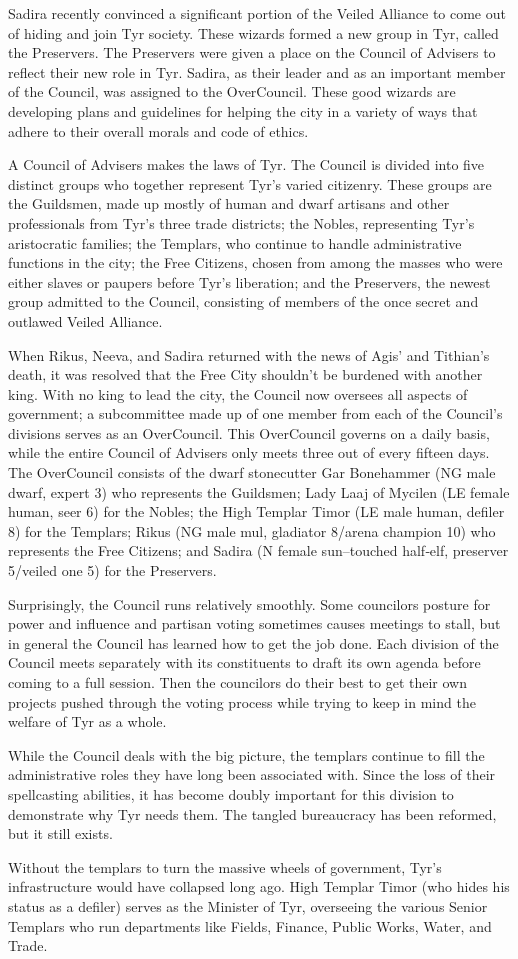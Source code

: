 {	Sadira recently convinced a significant portion of the Veiled Alliance to come out of hiding and join Tyr society. These wizards formed a new group in Tyr, called the Preservers. The Preservers were given a place on the Council of Advisers to reflect their new role in Tyr. Sadira, as their leader and as an important member of the Council, was assigned to the OverCouncil. These good wizards are developing plans and guidelines for helping the city in a variety of ways that adhere to their overall morals and code of ethics.
}
{
	A Council of Advisers makes the laws of Tyr. The Council is divided into five distinct groups who together represent Tyr's varied citizenry. These groups are the Guildsmen, made up mostly of human and dwarf artisans and other professionals from Tyr's three trade districts; the Nobles, representing Tyr's aristocratic families; the Templars, who continue to handle administrative functions in the city; the Free Citizens, chosen from among the masses who were either slaves or paupers before Tyr's liberation; and the Preservers, the newest group admitted to the Council, consisting of members of the once secret and outlawed Veiled Alliance.

	When Rikus, Neeva, and Sadira returned with the news of Agis' and Tithian's death, it was resolved that the Free City shouldn't be burdened with another king. With no king to lead the city, the Council now oversees all aspects of government; a subcommittee made up of one member from each of the Council's divisions serves as an OverCouncil. This OverCouncil governs on a daily basis, while the entire Council of Advisers only meets three out of every fifteen days. The OverCouncil consists of the dwarf stonecutter Gar Bonehammer (NG male dwarf, expert 3) who represents the Guildsmen; Lady Laaj of Mycilen (LE female human, seer 6) for the Nobles; the High Templar Timor (LE male human, defiler 8) for the Templars; Rikus (NG male mul, gladiator 8/arena champion 10) who represents the Free Citizens; and Sadira (N female sun–touched half‐elf, preserver 5/veiled one 5) for the Preservers.

	Surprisingly, the Council runs relatively smoothly. Some councilors posture for power and influence and partisan voting sometimes causes meetings to stall, but in general the Council has learned how to get the job done. Each division of the Council meets separately with its constituents to draft its own agenda before coming to a full session. Then the councilors do their best to get their own projects pushed through the voting process while trying to keep in mind the welfare of Tyr as a whole.

	While the Council deals with the big picture, the templars continue to fill the administrative roles they have long been associated with. Since the loss of their spellcasting abilities, it has become doubly important for this division to demonstrate why Tyr needs them. The tangled bureaucracy has been reformed, but it still exists.

	Without the templars to turn the massive wheels of government, Tyr's infrastructure would have collapsed long ago. High Templar Timor (who hides his status as a defiler) serves as the Minister of Tyr, overseeing the various Senior Templars who run departments like Fields, Finance, Public Works, Water, and Trade.
}

